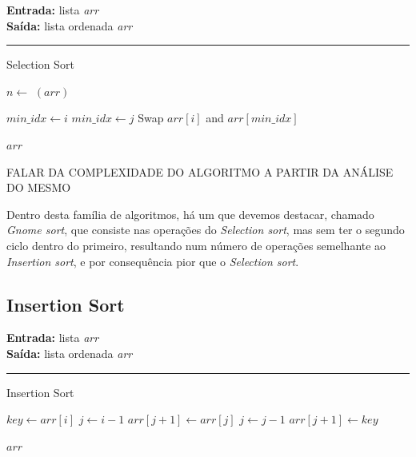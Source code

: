 \documentclass[conference]{IEEEtran}
\begin{document}
\begin{algorithm}[H]
    \raggedright
    \vspace{.1em}
    \textbf{Entrada:} lista \textit{arr} \\
    \textbf{Saída:} lista ordenada \textit{arr} \\
    \vspace{.5em}
    \hrule 
    \caption{Selection Sort}
    \begin{algorithmic}[1]
        \State $n \gets$ $(arr)$
    
            \State $min\_idx \gets i$
                    \State $min\_idx \gets j$
                \EndIf
            \EndFor
                \State Swap $arr[i]$ and $arr[min\_idx]$
            \EndIf
        \EndFor
    
        \State \Return $arr$
    \end{algorithmic}
\end{algorithm}

FALAR DA COMPLEXIDADE DO ALGORITMO A PARTIR DA ANÁLISE DO MESMO

Dentro desta família de algoritmos, há um que devemos destacar, chamado \textit{Gnome sort},  que consiste nas operações do \textit{Selection sort}, mas sem ter o segundo ciclo dentro do primeiro, resultando num número de operações semelhante ao \textit{Insertion sort}, e por consequência pior que o \textit{Selection sort}.

\subsection{Insertion Sort}

\begin{algorithm}[H]
    \raggedright
    \vspace{.1em}
    \textbf{Entrada:} lista \textit{arr} \\
    \textbf{Saída:} lista ordenada \textit{arr} \\
    \vspace{.5em}
    \hrule 
    \caption{Insertion Sort}
    \begin{algorithmic}[1]
            \State $key \gets arr[i]$
            \State $j \gets i - 1$
                \State $arr[j + 1] \gets arr[j]$
                \State $j \gets j - 1$
            \EndWhile
            \State $arr[j + 1] \gets key$
        \EndFor
    
        \State \Return $arr$
    \end{algorithmic}
\end{algorithm}
\end{document}
